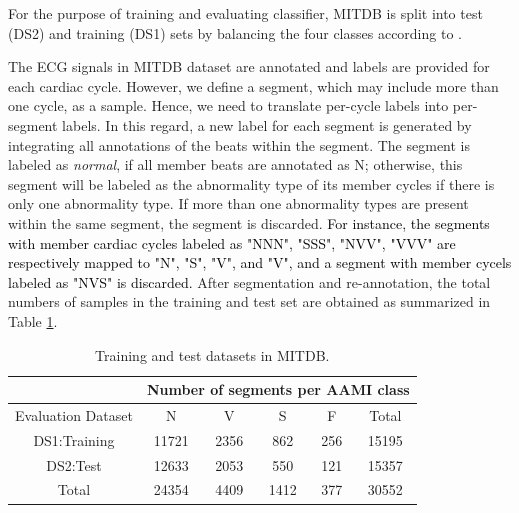 For the purpose of training and evaluating classifier, MITDB is split into test (DS2) and training (DS1) sets by balancing the four classes according to \cite{autofs}.


The ECG signals in MITDB dataset are annotated and labels are provided for each cardiac cycle. However, we define a segment, which may include more than one cycle, as a sample. Hence, we need to translate per-cycle labels into per-segment labels. In this regard, a new label for each segment is generated by integrating all annotations of the beats within the segment. The segment is labeled as \textit{normal}, if all member beats are annotated as N; otherwise, this segment will be labeled as the abnormality type of its member cycles if there is only one abnormality type. If more than one abnormality types are present within the same segment, the segment is discarded. \textcolor{black}{For instance, the segments with member cardiac cycles labeled as "NNN", "SSS", "NVV", "VVV" are respectively mapped to "N", "S", "V", and "V", and a segment with member cycels labeled as "NVS" is discarded.} 
After segmentation and re-annotation, the total numbers of samples in the training and test set are obtained as summarized in Table \ref{table:ds}.
\begin{table}[t]
	\centering
	\caption{Training and test datasets in MITDB.}
	\vspace{-0.05in}
	\begin{tabular}{|c|c|c|c|c|c|}
		\hline 
		& \multicolumn{5}{m{18em}|}{Number of segments per AAMI class}\\ 
		\hline 
		Evaluation Dataset& N & V & S & F &Total \\ 
		\hline 
		DS1:Training & 11721& 2356 & 862 & 256 & 15195\\ 
		\hline 
		DS2:Test & 12633 & 2053 & 550 & 121 & 15357 \\ 
		\hline 
		Total & 24354 & 4409 & 1412 & 377 & 30552 \\ 
		\hline 
	\end{tabular}
	\label{table:ds} 
	\vspace{-0.15in}
\end{table}

